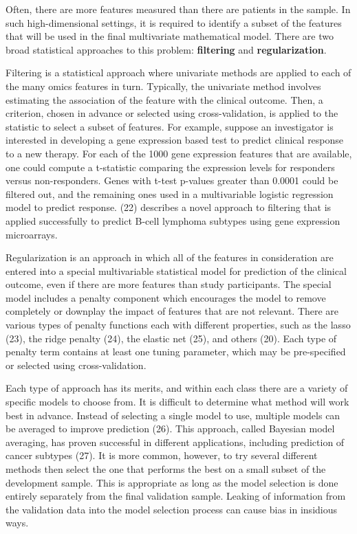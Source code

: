 \documentclass[11pt]{article}
\begin{document}
Often, there are more features measured than there are patients in the
sample. In such high-dimensional settings, it is required to identify a
subset of the features that will be used in the final multivariate
mathematical model. There are two broad statistical approaches to this
problem: \textbf{filtering} and \textbf{regularization}.

Filtering is a statistical approach where univariate methods are applied
to each of the many omics features in turn. Typically, the univariate
method involves estimating the association of the feature with the
clinical outcome. Then, a criterion, chosen in advance or selected using
cross-validation, is applied to the statistic to select a subset of
features. For example, suppose an investigator is interested in
developing a gene expression based test to predict clinical response to
a new therapy. For each of the 1000 gene expression features that are
available, one could compute a t-statistic comparing the expression
levels for responders versus non-responders. Genes with t-test p-values
greater than 0.0001 could be filtered out, and the remaining ones used
in a multivariable logistic regression model to predict response. (22)
describes a novel approach to filtering that is applied successfully to
predict B-cell lymphoma subtypes using gene expression microarrays.

Regularization is an approach in which all of the features in
consideration are entered into a special multivariable statistical model
for prediction of the clinical outcome, even if there are more features
than study participants. The special model includes a penalty component
which encourages the model to remove completely or downplay the impact
of features that are not relevant. There are various types of penalty
functions each with different properties, such as the lasso (23), the
ridge penalty (24), the elastic net (25), and others (20). Each type of
penalty term contains at least one tuning parameter, which may be
pre-specified or selected using cross-validation.

Each type of approach has its merits, and within each class there are a
variety of specific models to choose from. It is difficult to determine
what method will work best in advance. Instead of selecting a single
model to use, multiple models can be averaged to improve prediction
(26). This approach, called Bayesian model averaging, has proven
successful in different applications, including prediction of cancer
subtypes (27). It is more common, however, to try several different
methods then select the one that performs the best on a small subset of
the development sample. This is appropriate as long as the model
selection is done entirely separately from the final validation sample.
Leaking of information from the validation data into the model selection
process can cause bias in insidious ways.
\end{document}
